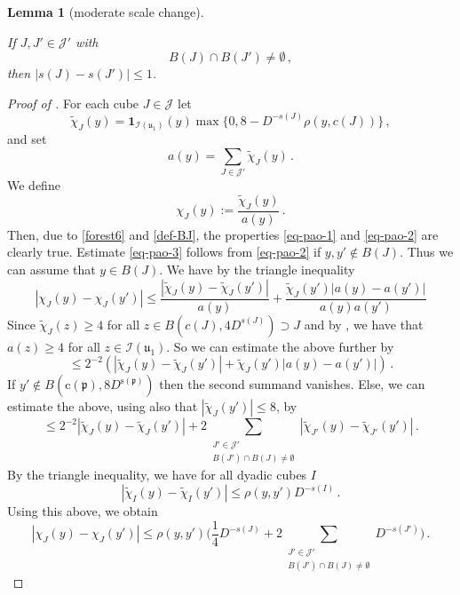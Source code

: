 \documentclass[10pt,a4paper]{article}
\theoremstyle{plain}
\newtheorem{lemma}[theorem]{Lemma}
\theoremstyle{definition}
\numberwithin{equation}{subsection}
\newcommand{\fp}{{\mathfrak p}}
\newcommand{\fu}{{\mathfrak u}}
\newcommand{\pc}{{\mathrm{c}}}
\newcommand{\ps}{{\mathrm{s}}}
\newcommand{\scI}{{\mathcal{I}}} %
\newcommand{\lean}[1]{}
\newcommand{\proves}[1]{}
\newcommand{\leanok}{}
\begin{document}
    \begin{lemma}[moderate scale change]
        \label{moderate-scale-change}
        \leanok
        \lean{TileStructure.Forest.moderate_scale_change}

        If $J, J' \in \mathcal{J'}$ with
        $$
            B(J) \cap B(J') \ne \emptyset\,,
        $$
        then $|s(J) - s(J')| \le 1$.
    \end{lemma}

    \begin{proof}[Proof of ]
        \leanok
        \proves{Lipschitz-partition-unity}
        For each cube $J \in \mathcal{J}$ let
        $$
            \tilde\chi_J(y) = \mathbf{1}_{\scI(\fu_1)}(y)\max\{0, 8 - D^{-s(J)} \rho(y, c(J))\}\,,
        $$
        and set
        $$
            a(y) = \sum_{J \in \mathcal{J}'} \tilde \chi_J(y)\,.
        $$
        We define
        \[
            \chi_J(y) := \frac{\tilde \chi_J(y)}{a(y)}\,.
        \]
        Then, due to \eqref{forest6} and \eqref{def-BJ}, the properties \eqref{eq-pao-1} and \eqref{eq-pao-2} are clearly true. Estimate \eqref{eq-pao-3} follows from \eqref{eq-pao-2} if $y, y' \notin B(J)$. Thus we can assume that $y \in B(J)$. We have by the triangle inequality
        $$
            |\chi_J(y) - \chi_J(y')| \le \frac{|\tilde \chi_J(y) - \tilde \chi_J(y')|}{a(y)} + \frac{\tilde \chi_J(y')|a(y) - a(y')|}{a(y)a(y')}
        $$
        Since $\tilde \chi_J(z) \ge 4$ for all $z \in B(c(J),4D^{s(J)}) \supset J$ and by , we have that $a(z) \ge 4$ for all $z \in \scI(\fu_1)$. So we can estimate the above further by
        $$
            \le 2^{-2}(|\tilde \chi_J(y) - \tilde \chi_J(y')| + \tilde \chi_J(y')|a(y) - a(y')|)\,.
        $$
        If $y' \notin B(\pc(\fp), 8D^{\ps(\fp)})$ then the second summand vanishes. Else, we can estimate the above, using also that $|\tilde \chi_J(y')| \le 8$, by
        $$
            \le 2^{-2} |\tilde \chi_J(y) - \tilde \chi_J(y')| + 2 \sum_{\substack{J' \in \mathcal{J}'\\ B(J') \cap B(J) \ne \emptyset}}|\tilde \chi_{J'}(y) - \tilde \chi_{J'} (y')|\,.
        $$
        By the triangle inequality, we have for all dyadic cubes $I$
        $$
            |\tilde \chi_I(y) - \tilde \chi_I(y')| \le \rho(y, y') D^{-s(I)}\,.
        $$
        Using this above, we obtain
        $$
            |\chi_J(y) - \chi_J(y')| \le \rho(y,y') \Big( \frac{1}{4} D^{-s(J)} + 2 \sum_{\substack{J' \in \mathcal{J}'\\ B(J') \cap B(J) \ne \emptyset}} D^{-s(J')}\Big)\,.
$$
\end{proof}
\end{document}
